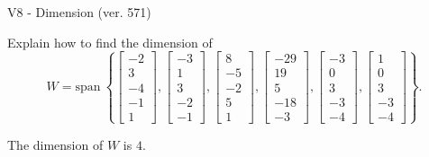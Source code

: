 \begin{exercise}
  \begin{exerciseTitle}V8 - Dimension (ver. 571)\end{exerciseTitle}
  \begin{exerciseStatement}
    Explain how to find the dimension of 
\[W=\mathrm{span}\ \left\{\left[\begin{array}{r}
-2 \\
3 \\
-4 \\
-1 \\
1
\end{array}\right] , \left[\begin{array}{r}
-3 \\
1 \\
3 \\
-2 \\
-1
\end{array}\right] , \left[\begin{array}{r}
8 \\
-5 \\
-2 \\
5 \\
1
\end{array}\right] , \left[\begin{array}{r}
-29 \\
19 \\
5 \\
-18 \\
-3
\end{array}\right] , \left[\begin{array}{r}
-3 \\
0 \\
3 \\
-3 \\
-4
\end{array}\right] , \left[\begin{array}{r}
1 \\
0 \\
3 \\
-3 \\
-4
\end{array}\right]\right\}.\]



  \end{exerciseStatement}
  \begin{exerciseAnswer}
   The dimension of \(W\) is  \(4\).
  


  \end{exerciseAnswer}
\end{exercise}